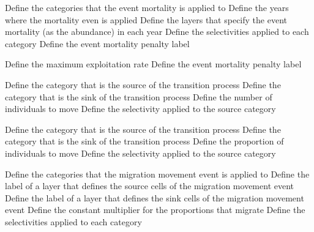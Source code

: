  {Define the categories that the event mortality is applied to}
 {Define the years where the mortality even is applied}
 {Define the layers that specify the event mortality (as the abundance) in each year}
 {Define the selectivities applied to each category}
 {Define the event mortality penalty label}
\par\textbf{}\par
{}
 {Define the maximum exploitation rate}
 {Define the event mortality penalty label}
\par\textbf{}\par
{} {Define the category that is the source of the transition process}
 {Define the category that is the sink of the transition process}
 {Define the number of individuals to move}
 {Define the selectivity applied to the source category}
\par\textbf{}\par
{} {Define the category that is the source of the transition process}
 {Define the category that is the sink of the transition process}
 {Define the proportion of individuals to move}
 {Define the selectivity applied to the source category}
\par\textbf{}\par
{} {Define the categories that the migration movement event is applied to}
 {Define the label of a layer that defines the source cells of the migration movement event}
 {Define the label of a layer that defines the sink cells of the migration movement event}
 {Define the constant multiplier for the proportions that migrate}
 {Define the selectivities applied to each category}
